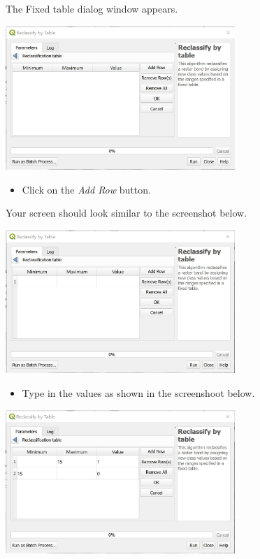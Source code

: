 \documentclass[
  letterpaper,
  DIV=11,
  numbers=noendperiod]{scrreprt}
\providecommand{\tightlist}{%
  \setlength{\itemsep}{0pt}\setlength{\parskip}{0pt}}\usepackage{longtable,booktabs,array}
\begin{document}
The Fixed table dialog window appears.

\includegraphics[width=0.65\textwidth,height=\textheight]{./img07/image32.jpg}

\begin{itemize}
\tightlist
\item
  Click on the \emph{Add Row} button.
\end{itemize}

Your screen should look similar to the screenshot below.

\includegraphics[width=0.65\textwidth,height=\textheight]{./img07/image33.jpg}

\begin{itemize}
\tightlist
\item
  Type in the values as shown in the screenshoot below.
\end{itemize}

\includegraphics[width=0.65\textwidth,height=\textheight]{./img07/image34.jpg}
\end{document}
